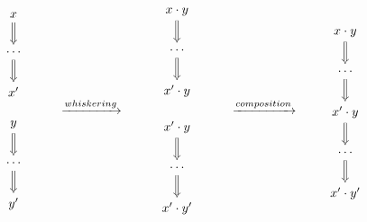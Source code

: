 \documentclass[../generics]{subfiles}
\begin{document}
\begin{figure}\label{monoid operation well defined}
\begin{ceqn}
\[
\begin{array}{c}
\begin{tikzcd}
x\arrow[d, Rightarrow]\\
\cdots\arrow[d, Rightarrow]\\
x'
\end{tikzcd}\\
\\
\begin{tikzcd}
y\arrow[d, Rightarrow]\\
\cdots\arrow[d, Rightarrow]\\
y'
\end{tikzcd}
\end{array} \qquad \xrightarrow{whiskering} \qquad
\begin{array}{c}
\begin{tikzcd}
x\cdot y\arrow[d, Rightarrow]\\
\cdots \arrow[d, Rightarrow]\\
x'\cdot y
\end{tikzcd}\\
\\
\begin{tikzcd}
x'\cdot y\arrow[d, Rightarrow]\\
\cdots\arrow[d, Rightarrow]\\
x'\cdot y'
\end{tikzcd}
\end{array} \qquad \xrightarrow{composition} \qquad
\begin{tikzcd}
x\cdot y\arrow[d, Rightarrow]\\
\cdots\arrow[d, Rightarrow]\\
x'\cdot y\arrow[d, Rightarrow]\\
\cdots\arrow[d, Rightarrow]\\
x'\cdot y'
\end{tikzcd}
\]
\end{ceqn}
\end{figure}
\end{document}
